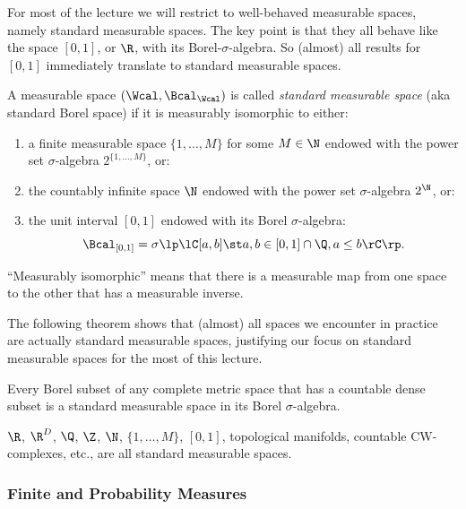 For most of the lecture we will restrict to well-behaved measurable spaces, namely standard measurable spaces. 
The key point is that they all behave like the space $[0,1]$, or $\R$, with its Borel-$\sigma$-algebra. So (almost) all results for $[0,1]$ immediately translate to standard measurable spaces. 

\begin{Def}
 A measurable space $(\Wcal,\Bcal_\Wcal)$ is called \emph{standard measurable space} (aka standard Borel space) if it is measurably isomorphic to either:
    \begin{enumerate}
        \item a finite measurable space $\{1,\dots,M\}$ for some $M \in \N$ endowed with the power set $\sigma$-algebra $2^{\{1,\dots,M\}}$, or:
        \item the countably infinite space $\N$ endowed with the power set $\sigma$-algebra $2^\N$, or:
        \item the unit interval $[0,1]$ endowed with its Borel $\sigma$-algebra:
           \[\Bcal_{[0,1]} =\sigma\lp\lC [a,b] \st a, b \in [0,1] \cap \Q, a \le b \rC \rp.\]
    \end{enumerate}
    ``Measurably isomorphic'' means that there is a measurable map from one space to the other that has a measurable inverse.
\end{Def}

The following theorem shows that (almost) all spaces we encounter in practice are actually standard measurable spaces, justifying our focus on standard measurable spaces for the most of this lecture.

\begin{Thm}
        Every Borel subset of any complete metric space that has a countable dense subset is a standard measurable space in its Borel $\sigma$-algebra.
\end{Thm}

\begin{Eg}
    $\R$, $\R^D$, $\Q$, $\Z$, $\N$, $\{1,\dots,M\}$,  $[0,1]$, topological manifolds, countable CW-complexes, etc., are all standard measurable spaces. 
\end{Eg}


\subsubsection{Finite and Probability Measures}

